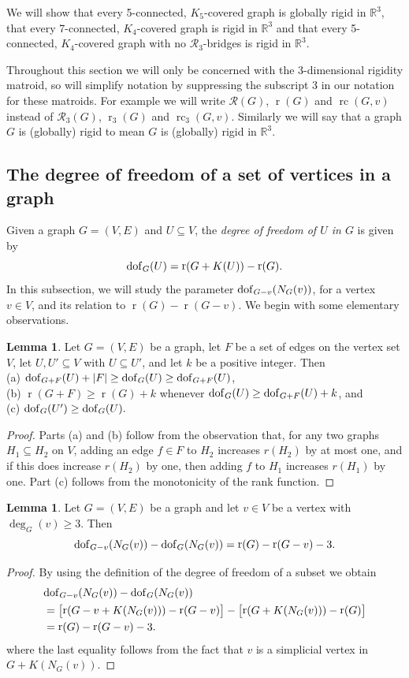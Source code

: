 \documentclass[11pt,a4paper]{article}
\theoremstyle{definition}
\newtheorem{lemma}[theorem]{Lemma}
\DeclareMathOperator{\rr}{r}
\DeclareMathOperator{\rc}{rc}
\newcommand{\cR}{\mathcal{R}}
\newcommand{\dof}{{\rm dof}}
\newcommand{\R}{\mathbb{R}}
\begin{document}
We will show that every 5-connected, $K_5$-covered graph is globally rigid in $\R^3$, that every 7-connected, $K_4$-covered graph is rigid in $\R^3$ and that every 5-connected, $K_4$-covered graph with no $\cR_3$-bridges is rigid  in $\R^3$. 

Throughout this section we will only be concerned with the 3-dimensional rigidity matroid, so will simplify notation by suppressing the subscript 3 in our notation for these matroids. For example we will write $\cR(G)$, $\rr(G)$ and $\rc(G,v)$ instead of $\cR_3(G)$, $\rr_3(G)$ and $\rc_3(G,v)$. Similarly we will say that a graph $G$ is (globally) rigid to mean $G$ is (globally) rigid in $\R^3$. 

\subsection{The degree of freedom of a set of vertices in a graph}


Given a graph $G=(V,E)$ and $U\subseteq V$, the {\em degree of freedom of $U$ in $G$} is given by
$$\dof_G(U)=\rr(G+K(U))-\rr(G).$$
In this subsection, we will study the parameter $\dof_{G-v}(N_G(v))$, for a vertex  $v\in V$, and its relation to $\rr(G)-\rr(G-v)$.
We begin with some elementary observations.

\begin{lemma}
\label{dofeasy}
Let $G=(V,E)$ be a graph, let $F$ be a set of edges on the vertex set $V$, let $U,U'\subseteq V$ with $U\subseteq U'$, and let $k$ be a positive integer. Then\\
(a) $\dof_{G+F}(U)+|F|\geq \dof_G(U) \geq \dof_{G+F}(U)$, \\
(b)  $\rr(G+F)\geq \rr(G)+k$ whenever $\dof_G(U) \geq \dof_{G+F}(U) + k$,  and \\
(c) $\dof_G(U')\geq \dof_G(U).$
\end{lemma}

\begin{proof}
Parts (a) and (b) follow from the observation that, for any two graphs $H_1\subseteq H_2$ on $V$,  adding an edge $f\in F$  to $H_2$ increases $r(H_2)$ by  at most one, and if this does increase $r(H_2)$ by one, then adding $f$ to $H_1$ increases $r(H_1)$ by one.  
Part (c) follows from the monotonicity of the rank function.
\end{proof}

\begin{lemma}\label{lem:dof:NGv:bound}
Let $G=(V,E)$ be a graph and let $v\in V$ be  a vertex with $\deg_G(v)\geq 3$. Then
$$\dof_{G-v}(N_G(v))-\dof_{G}(N_G(v))=\rr(G)-\rr(G-v)-3.$$
\end{lemma}
\begin{proof}
By using the definition of the degree of freedom of a subset we obtain
\begin{align*}
&\dof_{G-v}(N_G(v))-\dof_G(N_G(v))\\
&=\bigl[\rr(G-v+K(N_G(v)))-\rr(G-v)\bigr]
 -\bigl[\rr(G+K(N_G(v)))-\rr(G)\bigr]\\
&=\rr(G)-\rr(G-v)-3.
\end{align*}
where the last equality follows from the fact that $v$ is a simplicial vertex in $G+K(N_G(v))$.
\end{proof}
\end{document}
